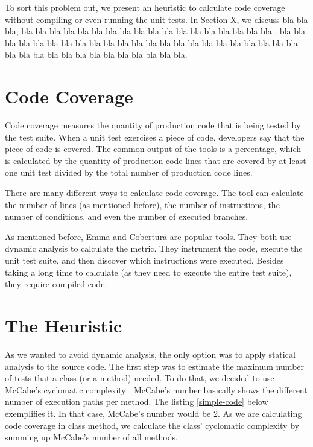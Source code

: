 \documentclass{sig-alternate}
\begin{document}
To sort this problem out, we present an heuristic to calculate code coverage without
compiling or even running the unit tests. In Section X, we discuss bla bla bla,
bla bla bla bla bla bla bla bla bla bla bla bla bla bla bla bla bla bla ,
bla bla bla bla bla bla bla bla bla bla bla bla bla bla bla bla bla bla 
bla bla bla bla bla bla bla bla bla bla bla bla bla bla bla bla bla bla\cite{bowman:reasoning}.




\section{Code Coverage}

Code coverage measures the quantity of production code that is being tested by
the test suite. When a unit test exercises a piece of code, developers say that the piece
of code is covered. The common output of the tools is a percentage, which is calculated
by the quantity of production code lines that are covered by at least one unit test divided by
the total number of production code lines.

There are many different ways to calculate code coverage. The tool can calculate the number
of lines (as mentioned before), the number of instructions, the number of conditions, and even
the number of executed branches.

As mentioned before, Emma and Cobertura are popular tools. 
They both use dynamic analysis to calculate the metric. They instrument the code, 
execute the unit test suite, and then discover which instructions were executed.
Besides taking a long time to calculate (as they need to execute the entire test suite),
they require compiled code.

\section{The Heuristic}

As we wanted to avoid dynamic analysis, the only option was to apply statical analysis to
the source code. The first step was to estimate the maximum number of tests that a class
(or a method) needed. To do that, we decided to use McCabe's cyclomatic complexity \cite{mccabe}.
McCabe's number basically shows the different number of execution paths per method. The listing
\ref{simple-code} below exemplifies it. In that case, McCabe's number would be 2.
As we are calculating code coverage in class method, we calculate the class' cyclomatic complexity
by summing up McCabe's number of all methods.
\end{document}

